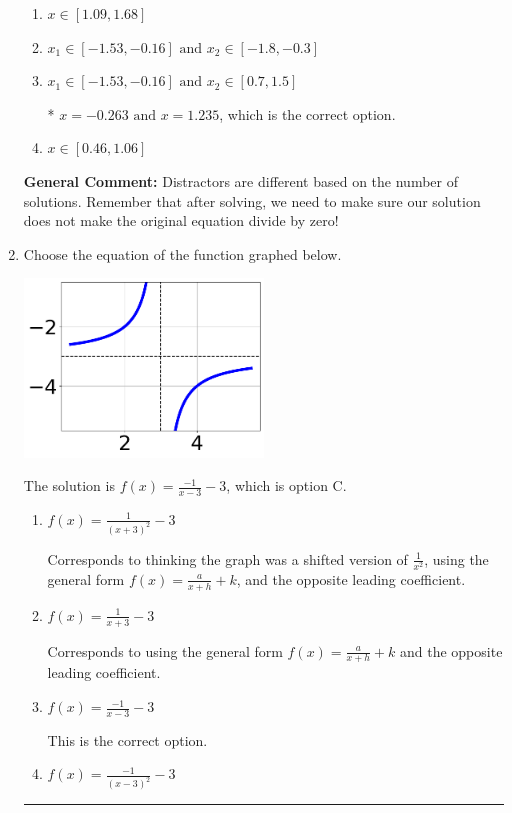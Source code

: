 \documentclass{extbook}[14pt]
\newcommand{\litem}[1]{\item #1

\rule{\textwidth}{0.4pt}}
\begin{document}
\begin{enumerate}
{\begin{enumerate}[label=\Alph*.]
\item \( x \in [1.09,1.68] \)


\item \( x_1 \in [-1.53, -0.16] \text{ and } x_2 \in [-1.8,-0.3] \)


\item \( x_1 \in [-1.53, -0.16] \text{ and } x_2 \in [0.7,1.5] \)

* $x = -0.263 \text{ and } x = 1.235$, which is the correct option.
\item \( x \in [0.46,1.06] \)


\end{enumerate}

\textbf{General Comment:} Distractors are different based on the number of solutions. Remember that after solving, we need to make sure our solution does not make the original equation divide by zero!
}
\litem{
Choose the equation of the function graphed below.

\begin{center}
    \includegraphics[width=0.5\textwidth]{../Figures/rationalGraphToEquationB.png}
\end{center}


The solution is \( f(x) = \frac{-1}{x - 3} - 3 \), which is option C.\begin{enumerate}[label=\Alph*.]
\item \( f(x) = \frac{1}{(x + 3)^2} - 3 \)

Corresponds to thinking the graph was a shifted version of $\frac{1}{x^2}$, using the general form $f(x) = \frac{a}{x+h}+k$, and the opposite leading coefficient.
\item \( f(x) = \frac{1}{x + 3} - 3 \)

Corresponds to using the general form $f(x) = \frac{a}{x+h}+k$ and the opposite leading coefficient.
\item \( f(x) = \frac{-1}{x - 3} - 3 \)

This is the correct option.
\item \( f(x) = \frac{-1}{(x - 3)^2} - 3 \)


\end{enumerate}}
\end{enumerate}
\end{document}
